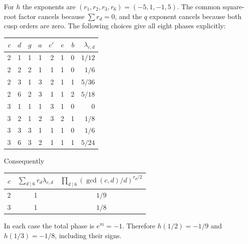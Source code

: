 \documentclass[11pt,a4paper]{article}
\theoremstyle{remark}
\begin{document}
For $h$ the exponents are $(r_1,r_2,r_3,r_6)=(-5,1,-1,5)$.
The common square-root factor cancels because $\sum r_d=0$,
and the $q$ exponent cancels because both cusp orders are zero.
The following choices give all eight phases explicitly:
\begin{center}\small
\begin{tabular}{r r r r r r r r}
\toprule
$c$ & $d$ & $g$ & $a$ & $c'$ & $e$ & $b$ & $\lambda_{c,d}$\\
\midrule
2 & 1 & 1 & 1 & 2 & 1 & 0 & $1/12$\\
2 & 2 & 2 & 1 & 1 & 1 & 0 & $1/6$\\
2 & 3 & 1 & 3 & 2 & 1 & 1 & $5/36$\\
2 & 6 & 2 & 3 & 1 & 1 & 2 & $5/18$\\
3 & 1 & 1 & 1 & 3 & 1 & 0 & $0$\\
3 & 2 & 1 & 2 & 3 & 2 & 1 & $1/8$\\
3 & 3 & 3 & 1 & 1 & 1 & 0 & $1/6$\\
3 & 6 & 3 & 2 & 1 & 1 & 1 & $5/24$\\
\bottomrule
\end{tabular}
\end{center}
Consequently
\begin{center}
\begin{tabular}{c c c}
\toprule
$c$ & $\sum_{d\mid6}r_d\lambda_{c,d}$
 & $\prod_{d\mid6}(\gcd(c,d)/d)^{r_d/2}$\\
\midrule
2 & 1 & $1/9$\\
3 & 1 & $1/8$\\
\bottomrule
\end{tabular}
\end{center}
In each case the total phase is $e^{\pi i}=-1$.
Therefore $h(1/2)=-1/9$ and $h(1/3)=-1/8$, including their signs.
\end{document}
